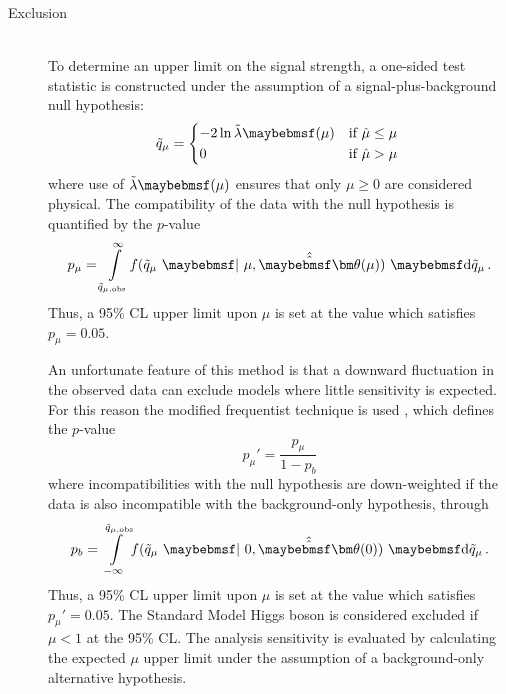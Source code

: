 \begin{description}
\item[Exclusion] \hfill \\
	To determine an upper limit on the signal strength, a one-sided test statistic is 
	constructed under the assumption of a signal-plus-background null hypothesis:
	\begin{equation}
		\tilde{q}_{\mu} = 
		\begin{dcases*}
			-2 \ln \tilde{\lambda}\parenths{\mu} & if $\hat{\mu} \leq \mu$ \\
			0 & if $\hat{\mu} > \mu$
		\end{dcases*}
	\end{equation}
	where use of $\tilde{\lambda}\parenths{\mu}$ ensures that only $\mu \geq 0$ are 
	considered physical. The compatibility of the data with the null hypothesis is 
	quantified by the $p$-value
	\begin{equation}
		p_{\mu} = \int\limits_{\tilde{q}_{\mu,\text{obs}}}^{\infty} \! f(\tilde{q}_{\mu}~\given~\mu, \hat{\hat{\bvec{\theta}}}(\mu)) \,\, \d{\tilde{q}_{\mu}} \,.
	\end{equation}
	Thus, a 95\% CL upper limit upon $\mu$ is set at the value which satisfies 
	$p_{\mu} = 0.05$.

	An unfortunate feature of this method is that a downward fluctuation in the observed 
	data can exclude models where little sensitivity is expected. For this reason the 
	modified frequentist \CLs technique is used \cite{Junk:CLs,Read:CLs}, which defines the 
	$p$-value
	\begin{equation}
		p_{\mu}' = \frac{p_{\mu}}{1 - p_{b}}
	\end{equation}
	where incompatibilities with the null hypothesis are down-weighted if the data is also 
	incompatible with the background-only hypothesis, through
	\begin{equation}
		p_{b} = \int\limits_{-\infty}^{\tilde{q}_{\mu,\text{obs}}} \! f(\tilde{q}_{\mu}~\given~0, \hat{\hat{\bvec{\theta}}}(0)) \,\, \d{\tilde{q}_{\mu}} \,.
	\end{equation}
	Thus, a 95\% CL upper limit upon $\mu$ is set at the value which satisfies 
	$p_{\mu}' = 0.05$. The Standard Model Higgs boson is considered excluded if $\mu < 1$ at 
	the 95\% CL. The analysis sensitivity is evaluated by calculating the expected $\mu$ 
	upper limit under the assumption of a background-only alternative hypothesis.


\end{description}
